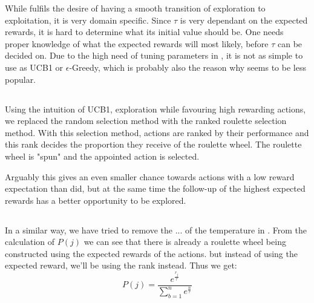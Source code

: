 While \soft fulfils the desire of having a smooth transition of exploration to exploitation, it is very domain specific. Since $\tau$ is very dependant on the expected rewards, it is hard to determine what its initial value should be. One needs proper knowledge of what the expected rewards will most likely, before $\tau$ can be decided on. Due to the high need of tuning parameters in \soft, it is not as simple to use as UCB1 or $\epsilon$-Greedy, which is probably also the reason why seems to be less popular.

\subsection{\eroulette} 
Using the intuition of UCB1, exploration while favouring high rewarding actions, we replaced the random selection method with the ranked roulette selection method. With this selection method, actions are ranked by their performance and this rank decides the proportion they receive of the roulette wheel. The roulette wheel is "spun" and the appointed action is selected.

Arguably this gives an even smaller chance towards actions with a low reward expectation than \egreedy did, but at the same time the follow-up of the highest expected rewards has a better opportunity to be explored. 

\subsection{\rsoft}
In a similar way, we have tried to remove the ... of the temperature in \soft. From the calculation of $P(j)$ we can see that there is already a roulette wheel being constructed using the expected rewards of the actions. but instead of using the expected reward, we'll be using the rank instead. Thus we get:
\begin{equation}
P(j) = \frac{e^\frac{r_j}{\tau}}{\sum_{b=1}^{n} e^\frac{n}{\tau}}
\end{equation}